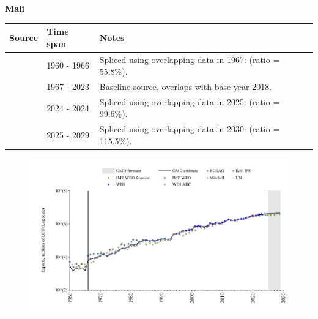 \documentclass[12pt,a4paper,landscape]{article}
\begin{document}
\begin{adjustbox}{max totalsize={\paperwidth}{\paperheight},center}
\begin{minipage}[t][\textheight][t]{\textwidth}
\vspace*{0.5cm}
{}
\begin{center}
{\Large\bfseries Mali}
\end{center}
\vspace{0.5cm}
\begin{table}[H]
\centering
\small
\begin{tabular}{|l|l|l|}
\hline
\textbf{Source} & \textbf{Time span} & \textbf{Notes} \\
\hline
\rowcolor{white}\cite{BCEAO}& 1960 - 1966 &Spliced using overlapping data in 1967: (ratio = 55.8\%).\\
\rowcolor{lightgray}\cite{WDI}& 1967 - 2023 &Baseline source, overlaps with base year 2018.\\
\rowcolor{white}\cite{BCEAO}& 2024 - 2024 &Spliced using overlapping data in 2025: (ratio = 99.6\%).\\
\rowcolor{lightgray}\cite{IMF_WEO_forecast}& 2025 - 2029 &Spliced using overlapping data in 2030: (ratio = 115.5\%).\\
\hline
\end{tabular}
\end{table}
\begin{figure}[H]
\centering
\includegraphics[width=\textwidth,height=0.6\textheight,keepaspectratio]{graphs/MLI_exports.pdf}
\end{figure}
\end{minipage}
\end{adjustbox}
\end{document}
